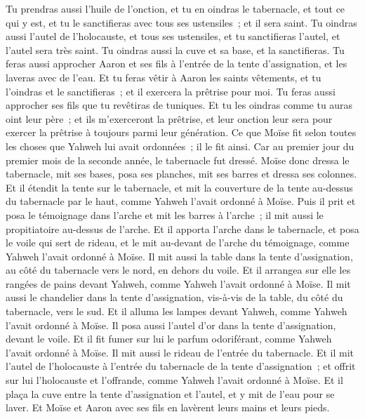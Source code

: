 \begin{multicols}{2}
Tu prendras aussi l'huile de l'onction, et tu en oindras le tabernacle, et tout ce qui y est, et tu le sanctifieras avec tous ses ustensiles~; et il sera saint.
Tu oindras aussi l'autel de l'holocauste, et tous ses ustensiles, et tu sanctifieras l'autel, et l'autel sera très saint.
Tu oindras aussi la cuve et sa base, et la sanctifieras.
Tu feras aussi approcher Aaron et ses fils à l'entrée de la tente d'assignation, et les laveras avec de l'eau.
Et tu feras vêtir à Aaron les saints vêtements, et tu l'oindras et le sanctifieras~; et il exercera la prêtrise pour moi.
Tu feras aussi approcher ses fils que tu revêtiras de tuniques.
 Et tu les oindras comme tu auras oint leur père~; et ils m'exerceront la prêtrise, et leur onction leur sera pour exercer la prêtrise à toujours parmi leur génération.
 Ce que Moïse fit selon toutes les choses que Yahweh lui avait ordonnées~; il le fit ainsi.
Car au premier jour du premier mois de la seconde année, le tabernacle fut dressé.
Moïse donc dressa le tabernacle, mit ses bases, posa ses planches, mit ses barres et dressa ses colonnes.
Et il étendit la tente sur le tabernacle, et mit la couverture de la tente au-dessus du tabernacle par le haut, comme Yahweh l'avait ordonné à Moïse.
Puis il prit et posa le témoignage dans l'arche et mit les barres à l'arche~; il mit aussi le propitiatoire au-dessus de l'arche.
Et il apporta l'arche dans le tabernacle, et posa le voile qui sert de rideau, et le mit au-devant de l'arche du témoignage, comme Yahweh l'avait ordonné à Moïse.
Il mit aussi la table dans la tente d'assignation, au côté du tabernacle vers le nord, en dehors du voile.
Et il arrangea sur elle les rangées de pains devant Yahweh, comme Yahweh l'avait ordonné à Moïse.
Il mit aussi le chandelier dans la tente d'assignation, vis-à-vis de la table, du côté du tabernacle, vers le sud.
Et il alluma les lampes devant Yahweh, comme Yahweh l'avait ordonné à Moïse.
Il posa aussi l'autel d'or dans la tente d'assignation, devant le voile.
Et il fit fumer sur lui le parfum odoriférant, comme Yahweh l'avait ordonné à Moïse.
Il mit aussi le rideau de l'entrée du tabernacle.
Et il mit l'autel de l'holocauste à l'entrée du tabernacle de la tente d'assignation~; et offrit sur lui l'holocauste et l'offrande, comme Yahweh l'avait ordonné à Moïse.
Et il plaça la cuve entre la tente d'assignation et l'autel, et y mit de l'eau pour se laver.
Et Moïse et Aaron avec ses fils en lavèrent leurs mains et leurs pieds.

\end{multicols}
